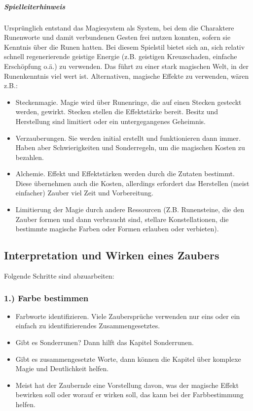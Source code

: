 \documentclass{article}
\begin{document}
\begin{mdframed}[hidealllines=true, backgroundcolor=black!10]
\subparagraph{Spielleiterhinweis}

Ursprünglich entstand das Magiesystem als System, bei dem die Charaktere Runenworte und damit verbundenen Gesten frei
nutzen konnten, sofern sie Kenntnis über die Runen hatten. Bei diesem Spielstil bietet sich an, sich relativ schnell
regenerierende geistige Energie (z.B. geistigen Kreuzschaden, einfache Erschöpfung o.ä.) zu verwenden. Das führt zu
einer stark magischen Welt, in der Runenkenntnis viel wert ist. Alternativen, magische Effekte zu verwenden, wären z.B.:

\begin{itemize}
\item Steckenmagie. Magie wird über Runenringe, die auf einen Stecken gesteckt werden, gewirkt. Stecken stellen die Effektstärke bereit. Besitz und Herstellung sind limitiert oder ein untergegangenes Geheimnis.
\item Verzauberungen. Sie werden initial erstellt und funktionieren dann immer. Haben aber Schwierigkeiten und Sonderregeln, um die magischen Kosten zu bezahlen.
\item Alchemie. Effekt und Effektstärken werden durch die Zutaten bestimmt. Diese übernehmen auch die Kosten, allerdings erfordert das Herstellen (meist einfacher) Zauber viel Zeit und Vorbereitung.
\item Limitierung der Magie durch andere Ressourcen (Z.B. Runensteine, die den Zauber formen und dann verbraucht sind, stellare Konstellationen, die bestimmte magische Farben oder Formen erlauben oder verbieten).
\end{itemize}

\end{mdframed}
\begin{center}
\subsection{Interpretation und Wirken eines Zaubers}
\end{center}

Folgende Schritte sind abzuarbeiten:

\subsubsection{1.) Farbe bestimmen}

\begin{itemize}
\item Farbworte identifizieren. Viele Zaubersprüche verwenden nur eins oder ein einfach zu identifizierendes Zusammengesetztes.
\item Gibt es Sonderrunen? Dann hilft das Kapitel Sonderrunen.
\item Gibt es zusammengesetzte Worte, dann können die Kapitel über komplexe Magie und Deutlichkeit helfen.
\item Meist hat der Zaubernde eine Vorstellung davon, was der magische Effekt bewirken soll oder worauf er wirken soll, das kann bei der Farbbestimmung helfen.
\end{itemize}
\end{document}
